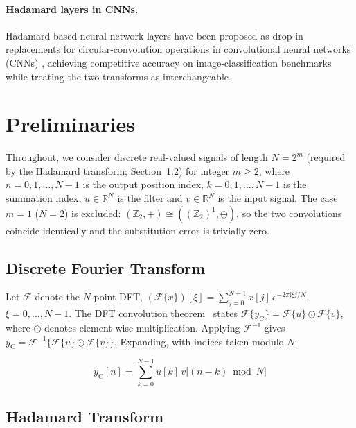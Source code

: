 \documentclass[11pt]{article}
\begin{document}
\paragraph{Hadamard layers in CNNs.}
Hadamard‑based neural network layers have been proposed as drop‑in replacements for circular‑convolution operations in convolutional neural networks (CNNs) \cite{pan2021fast, pan2022block, pan2023htlayer}, achieving competitive accuracy on image‑classification benchmarks while treating the two transforms as interchangeable.


\section{Preliminaries}

Throughout, we consider discrete real-valued signals of length $N = 2^m$ (required by the Hadamard transform; Section~\ref{sec:hadamard-transform}) for integer $m \geq 2$, where $n = 0, 1, \ldots, N-1$ is the output position index, $k = 0, 1, \ldots, N-1$ is the summation index, $u \in \mathbb{R}^N$ is the filter and $v \in \mathbb{R}^N$ is the input signal. The case $m=1$ ($N=2$) is excluded: $(\mathbb{Z}_2,+) \cong ((\mathbb{Z}_2)^1,\oplus)$, so the two convolutions coincide identically and the substitution error is trivially zero.

\subsection{Discrete Fourier Transform}

Let $\mathcal{F}$ denote the $N$-point DFT, $(\mathcal{F}\{x\})[\xi] = \sum_{j=0}^{N-1} x[j]\,e^{-2\pi \mathrm{i}\xi j/N}$, $\xi = 0,\ldots,N-1$. The DFT convolution theorem~\cite{cooley1965algorithm, lyonsdsp2011} states $\mathcal{F}\{y_{\mathrm{C}}\} = \mathcal{F}\{u\} \odot \mathcal{F}\{v\}$, where $\odot$ denotes element-wise multiplication. Applying $\mathcal{F}^{-1}$ gives $y_{\mathrm{C}} = \mathcal{F}^{-1}\!\bigl\{\mathcal{F}\{u\} \odot \mathcal{F}\{v\}\bigr\}$. Expanding, with indices taken modulo $N$:

\begin{equation}
   \label{eq:circ-conv}
   y_{\mathrm{C}}[n] = \sum_{k=0}^{N-1} u[k]\,v\bigl[(n-k)\bmod N\bigr]
\end{equation}

\subsection{Hadamard Transform}
\label{sec:hadamard-transform}
\end{document}
